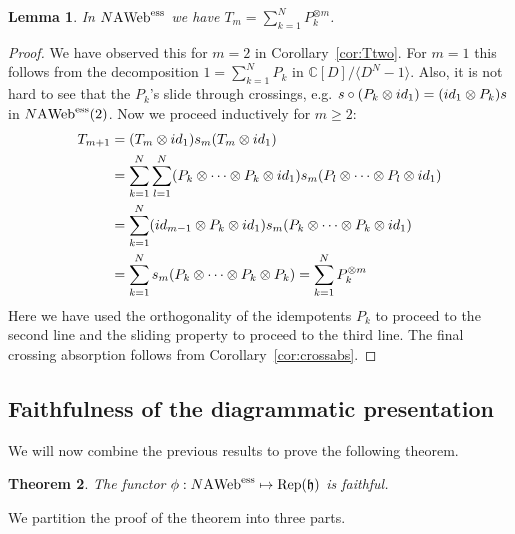 \documentclass[11pt]{article}
\newtheorem{theo}{Theorem}[section]
\newtheorem{lemma}[theo]{Lemma}
\theoremstyle{definition}
\numberwithin{equation}{section}
\def\C{{\mathbb C}}
\newcommand{\id}{{\rm id}}
\newcommand{\reph}{\Rep(\h)}
\def\h{{\mathfrak h}}
\newcommand{\Rep}{\cat{Rep}}
\newcommand{\cat}[1]{\ensuremath{\mbox{\bfseries {\upshape {#1}}}}}
\newcommand{\wrap}{D}
\newcommand{\AWeb}[1][]{#1\cat{A}\cat{Web}}
\newcommand{\essAWeb}[1][]{#1\AWeb^{\mathrm{ess}}}
\def\la{\langle}
\def\ra{\rangle}
\begin{document}
\begin{lemma}\label{lem:projexpand} In $\essAWeb[N]$ we have $T_m=\sum_{k=1}^N  P_k^{\otimes m}$.
\end{lemma}
\begin{proof} We have observed this for $m=2$ in Corollary~\ref{cor:Ttwo}. For $m=1$ this follows from the decomposition $1=\sum_{k=1}^N P_k$ in $\C[\wrap]/\la \wrap^N-1\ra$. Also, it is not hard to see that the $P_k$'s slide through crossings, e.g. $s \circ (P_k\otimes \id_1)=(\id_1 \otimes P_k) s$ in $\essAWeb[N](2)$. Now we proceed inductively for $m\geq 2$:
\begin{align*}
T_{m+1} &= (T_m\otimes \id_1)s_m(T_m\otimes \id_1) \\
&= \sum_{k=1}^N\sum_{l=1}^N (P_k\otimes\cdots \otimes P_k\otimes \id_1)s_m(P_l\otimes\cdots \otimes P_l\otimes \id_1) 
\\&= \sum_{k=1}^N (\id_{m-1} \otimes P_k\otimes \id_1) s_m(P_k\otimes\cdots \otimes P_k\otimes \id_1)
\\&= \sum_{k=1}^N s_m (P_k\otimes\cdots \otimes P_k\otimes P_k) =\sum_{k=1}^N  P_k^{\otimes m}
\end{align*}
Here we have used the orthogonality of the idempotents $P_k$ to proceed to the second line and the sliding property to proceed to the third line. The final crossing absorption follows from Corollary~\ref{cor:crossabs}. 
\end{proof}

\subsection{Faithfulness of the diagrammatic presentation}
We will now combine the previous results to prove the following theorem.

\begin{theo} \label{thm:faithfulness}
    The functor $\phi:\essAWeb[N]\mapsto \reph$ is faithful.
\end{theo}



We partition the proof of the theorem into three parts.
\end{document}
